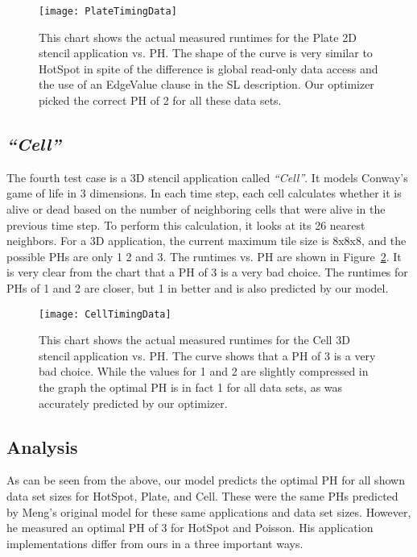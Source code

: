 \documentclass{styles/sig-alternate}
\begin{document}
\begin{figure}
\texttt{[image: PlateTimingData]}
\caption{This chart shows the actual measured runtimes for the Plate 2D stencil application vs. PH.
The shape of the curve is very similar to HotSpot in spite of the difference is global read-only data access
and the use of an EdgeValue clause in the SL description.  Our optimizer picked the correct PH of 2 for all these data sets.}
\label{fig:plateTimes}
\end{figure}

\subsection{\em ``Cell''}
The fourth test case is a 3D stencil application called {\em ``Cell''}.  It models Conway's game of life in 3 dimensions.  
In each time step, each cell calculates whether it is alive or dead based on the number of neighboring cells that were alive in the previous
time step.  To perform this calculation, it looks at its 26 nearest neighbors.  For a 3D application, the current maximum tile size is 8x8x8, 
and the possible PHs are only 1 2 and 3.  The runtimes vs. PH are shown in Figure~\ref{fig:cellTimes}.  
It is very clear from the chart that a PH of 3 is a very bad choice.  The runtimes for PHs of 1 and 2 are closer, 
but 1 in better and is also predicted by our model.

\begin{figure}
\texttt{[image: CellTimingData]}
\caption{This chart shows the actual measured runtimes for the Cell 3D stencil application vs. PH.
The curve shows that a PH of 3 is a very bad choice.  While the values for 1 and 2 are slightly 
compressed in the graph the optimal PH is in fact 1 for all data sets, as was accurately predicted by our optimizer.}
\label{fig:cellTimes}
\end{figure}

\subsection{Analysis}
As can be seen from the above, our model predicts the optimal PH for all shown data set sizes for HotSpot, Plate, and Cell.
These were the same PHs predicted by Meng's original model for these same applications and data set sizes.  However, he measured 
an optimal PH of 3 for HotSpot and Poisson.  His application implementations differ from ours in a three important ways.  
\end{document}
